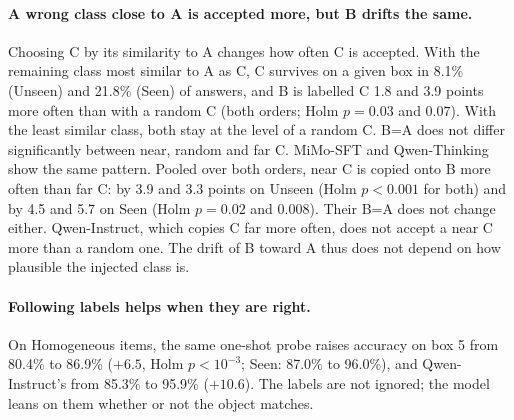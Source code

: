 \paragraph{A wrong class close to A is accepted more, but B drifts the same.} Choosing C by its
similarity to A changes how often C is accepted. With the remaining class most similar to A as C,
C survives on a given box in 8.1\% (Unseen) and 21.8\% (Seen) of answers, and B is labelled C 1.8
and 3.9 points more often than with a random C (both orders; Holm $p=0.03$ and $0.07$). With the
least similar class, both stay at the level of a random C. B=A does not differ significantly between
near, random and far C. MiMo-SFT and Qwen-Thinking show the same pattern. Pooled over both orders,
near C is copied onto B more often than far C: by 3.9 and 3.3 points on Unseen (Holm $p<0.001$ for
both) and by 4.5 and 5.7 on Seen (Holm $p=0.02$ and $0.008$). Their B=A does not change either.
Qwen-Instruct, which copies C far more often, does not accept a near C more than a random one. The
drift of B toward A thus does not depend on how plausible the injected class is.

\paragraph{Following labels helps when they are right.} On Homogeneous items, the same one-shot probe
raises accuracy on box 5 from 80.4\% to 86.9\% ($+6.5$, Holm $p<10^{-3}$; Seen: 87.0\% to 96.0\%),
and Qwen-Instruct's from 85.3\% to 95.9\% ($+10.6$).
The labels are not ignored; the model leans on them whether or not the object matches.

